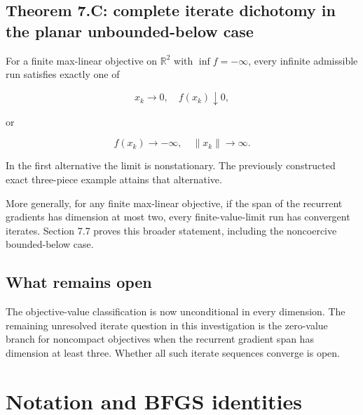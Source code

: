 

\subsection{Theorem 7.C: complete iterate dichotomy in the planar
unbounded-below
case}\label{H:theorem-c-complete-iterate-dichotomy-in-the-planar-unbounded-below-case}

For a finite max-linear objective on \(\mathbb R^2\) with
\(\inf f=-\infty\), every infinite admissible run satisfies exactly one
of

\[
\boxed{x_k\longrightarrow0,\quad f(x_k)\downarrow0,}
\]

or

\[
\boxed{f(x_k)\longrightarrow-\infty,\quad\|x_k\|\longrightarrow\infty.}
\]

In the first alternative the limit is nonstationary. The previously
constructed exact three-piece example attains that alternative.

More generally, for any finite max-linear objective, if the span of the
recurrent gradients has dimension at most two, every finite-value-limit
run has convergent iterates. Section 7.7 proves this broader statement,
including the noncoercive bounded-below case.



\subsection{What remains open}\label{H:what-this-does-not-yet-establish}

The objective-value classification is now unconditional in every
dimension. The remaining unresolved iterate question in this
investigation is the zero-value branch for noncompact objectives when
the recurrent gradient span has dimension at least three. Whether all
such iterate sequences converge is open.


\setcounter{section}{1}
\setcounter{theorem}{0}
\setcounter{lemma}{0}
\setcounter{corollary}{0}
\setcounter{proposition}{0}
\setcounter{remark}{0}
\setcounter{equation}{0}


\section{Notation and BFGS
identities}\label{H:notation-and-bfgs-identities}

